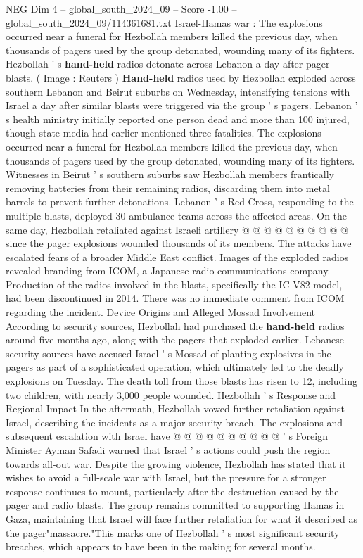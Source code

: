 \begin{textsample}{NEG Dim 4 – global\_south\_2024\_09 – Score -1.00 – global\_south\_2024\_09/114361681.txt}  \label{ex:f4_neg_162}
Israel-Hamas war : The explosions occurred near a funeral for Hezbollah members killed the previous day, when thousands of pagers used by the group detonated, wounding many of its fighters.
Hezbollah ' s \textbf{hand-held} radios detonate across Lebanon a day after pager blasts. ( Image : Reuters ) \textbf{Hand-held} radios used by Hezbollah exploded across southern Lebanon and Beirut suburbs on Wednesday, intensifying tensions with Israel a day after similar blasts were triggered via the group ' s pagers.
Lebanon ' s health ministry initially reported one person dead and more than 100 injured, though state media had earlier mentioned three fatalities.
The explosions occurred near a funeral for Hezbollah members killed the previous day, when thousands of pagers used by the group detonated, wounding many of its fighters.
Witnesses in Beirut ' s southern suburbs saw Hezbollah members frantically removing batteries from their remaining radios, discarding them into metal barrels to prevent further detonations.
Lebanon ' s Red Cross, responding to the multiple blasts, deployed 30 ambulance teams across the affected areas.
On the same day, Hezbollah retaliated against Israeli artillery @ @ @ @ @ @ @ @ @ @ since the pager explosions wounded thousands of its members.
The attacks have escalated fears of a broader Middle East conflict.
Images of the exploded radios revealed branding from ICOM, a Japanese radio communications company.
Production of the radios involved in the blasts, specifically the IC-V82 model, had been discontinued in 2014.
There was no immediate comment from ICOM regarding the incident.
Device Origins and Alleged Mossad Involvement According to security sources, Hezbollah had purchased the \textbf{hand-held} radios around five months ago, along with the pagers that exploded earlier.
Lebanese security sources have accused Israel ' s Mossad of planting explosives in the pagers as part of a sophisticated operation, which ultimately led to the deadly explosions on Tuesday.
The death toll from those blasts has risen to 12, including two children, with nearly 3,000 people wounded.
Hezbollah ' s Response and Regional Impact In the aftermath, Hezbollah vowed further retaliation against Israel, describing the incidents as a major security breach.
The explosions and subsequent escalation with Israel have @ @ @ @ @ @ @ @ @ @ ' s Foreign Minister Ayman Safadi warned that Israel ' s actions could push the region towards all-out war.
Despite the growing violence, Hezbollah has stated that it wishes to avoid a full-scale war with Israel, but the pressure for a stronger response continues to mount, particularly after the destruction caused by the pager and radio blasts.
The group remains committed to supporting Hamas in Gaza, maintaining that Israel will face further retaliation for what it described as the pager"massacre."This marks one of Hezbollah ' s most significant security breaches, which appears to have been in the making for several months.

\end{textsample}

